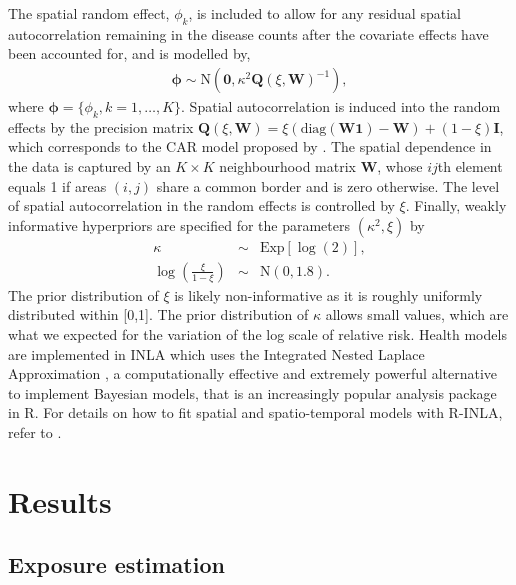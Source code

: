 \documentclass[12,]{article}
\begin{document}
The spatial random effect, \(\phi_{k}\), is included to allow for any
residual spatial autocorrelation remaining in the disease counts after
the covariate effects have been accounted for, and is modelled by,
\begin{eqnarray}\label{eq:model2}
\symbf{\phi} \sim \mbox{N}\left(\symbf{0},\kappa^2 \symbf{Q}(\xi,\symbf{W})^{-1}\right),
\end{eqnarray} where \(\symbf{\phi}=\{\phi_k, k=1,\dots, K\}\). Spatial
autocorrelation is induced into the random effects by the precision
matrix
\(\symbf{Q}(\xi,\symbf{W})=\xi(\mbox{diag}(\symbf{W}\symbf{1})-\symbf{W})+(1-\xi)\symbf{I}\),
which corresponds to the CAR model proposed by \textcite{Leroux1999}.
The spatial dependence in the data is captured by an \(K \times K\)
neighbourhood matrix \(\symbf{W}\), whose \(ij\)th element equals 1 if
areas \((i,j )\) share a common border and is zero otherwise. The level
of spatial autocorrelation in the random effects is controlled by
\(\xi\). Finally, weakly informative hyperpriors are specified for the
parameters \((\kappa^2,\xi)\) by \begin{eqnarray}\label{eq:model3}
\kappa &\sim &  \mbox{Exp}[\log(2)],\\\nonumber
\log\left(\frac{\xi}{1-\xi}\right) &\sim & \mbox{N}(0,1.8).
\end{eqnarray} The prior distribution of \(\xi\) is likely
non-informative as it is roughly uniformly distributed within {[}0,1{]}.
The prior distribution of \(\kappa\) allows small values, which are what
we expected for the variation of the log scale of relative risk. Health
models are implemented in INLA which uses the Integrated Nested Laplace
Approximation \autocite{Rue2009}, a computationally effective and
extremely powerful alternative to implement Bayesian models, that is an
increasingly popular analysis package in R. For details on how to fit
spatial and spatio-temporal models with R-INLA, refer to
\textcite{Blangiardo2013}.

\hypertarget{sec:results}{%
\section{Results}\label{sec:results}}

\hypertarget{exposure-estimation}{%
\subsection{Exposure estimation}\label{exposure-estimation}}
\end{document}
